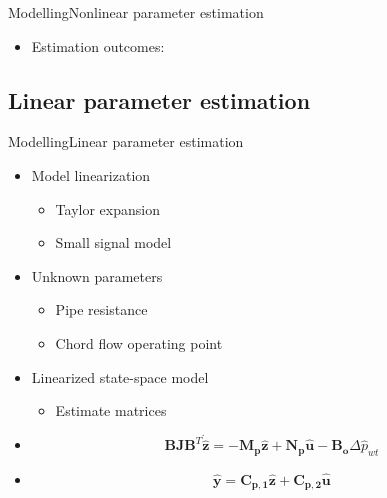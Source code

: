 \begin{frame}{Modelling}{Nonlinear parameter estimation}
\begin{itemize}
	\item<1-> Estimation outcomes: 	
\end{itemize}

\begin{figure}[H]
  \centering
  \begin{minipage}[h]{0.45\textwidth}
    
  \end{minipage}
  \hfill
  \begin{minipage}[h]{0.45\textwidth}
   
  \end{minipage}
\end{figure}
\end{frame}

\subsection{Linear parameter estimation}

\begin{frame}{Modelling}{Linear parameter estimation}
\begin{itemize}
	\item<1-> Model linearization
	\begin{itemize}
		\item<1-> Taylor expansion
		\item<1-> Small signal model
	\end{itemize}	
\end{itemize}

\begin{itemize}
	\item<2-> Unknown parameters
	\begin{itemize}
		\item<2-> Pipe resistance
		\item<2-> Chord flow operating point
	\end{itemize}	
\end{itemize}

\begin{itemize}
	\item<3-> Linearized state-space model
	\begin{itemize}
		\item<3-> Estimate matrices
	\end{itemize}
\end{itemize}	

\begin{itemize}
	\item<3->[]
		\begin{equation}
		\pmb{B}\pmb{J {B}}^T \pmb{\dot{\hat{z}}} = -\pmb{M_p} \pmb{\hat{z}} + \pmb{N_p} \pmb{\hat{u}} - \pmb{B_o} \Delta \hat{p}_{wt} 
		\end{equation}
	\item<3->[]
		\begin{equation}
		\pmb{\hat{y}} = \pmb{C_{p,1}} \pmb{\hat{z}}  + \pmb{C_{p,2}}\pmb{\hat{u}}  
		\end{equation}	
\end{itemize}
\end{frame}


